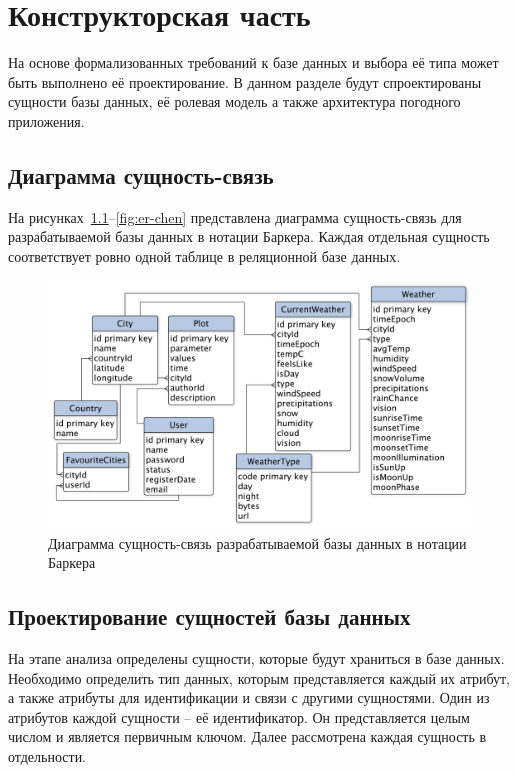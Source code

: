 \chapter{Конструкторская часть}

На основе формализованных требований к базе данных и выбора её типа может быть выполнено её проектирование.
В данном разделе будут спроектированы сущности базы данных, её ролевая модель а также архитектура погодного приложения.

\section{Диаграмма сущность-связь}
На рисунках~\ref{fig:er-barker}--\ref{fig:er-chen} представлена диаграмма сущность-связь для разрабатываемой базы данных в нотации Баркера.
Каждая отдельная сущность соответствует ровно одной таблице в реляционной базе данных.
\begin{figure}[H]
	\centering
	\includegraphics[width=\textwidth]{tools/img/er-barker.pdf}
	\caption{
        Диаграмма сущность-связь разрабатываемой базы данных в нотации Баркера
    }
	\label{fig:er-barker}
\end{figure}

\section{Проектирование сущностей базы данных}

На этапе анализа определены сущности, которые будут храниться в базе данных.
Необходимо определить тип данных, которым представляется каждый их атрибут, а также атрибуты для идентификации и связи с другими сущностями.
Один из атрибутов каждой сущности -- её идентификатор.
Он представляется целым числом и является первичным ключом.
Далее рассмотрена каждая сущность в отдельности.


